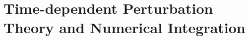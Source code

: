 \documentclass[../classnotes.tex]{subfiles}
\begin{document}
\chapter{Time-dependent Perturbation Theory and Numerical Integration}

\end{document}
